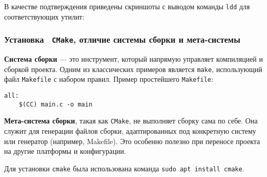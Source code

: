 В качестве подтверждения приведены скриншоты с выводом команды \texttt{ldd} для соответствующих утилит:






\subsubsection*{Установка  \texttt{CMake}, отличие системы сборки и мета-системы}

\textbf{Система сборки} — это инструмент, который напрямую управляет компиляцией и сборкой проекта. Одним из классических примеров является \texttt{make}, использующий файл \texttt{Makefile} с набором правил. Пример простейшего \texttt{Makefile}:

\begin{verbatim}
all:
	$(CC) main.c -o main
\end{verbatim}

\textbf{Мета-система сборки}, такая как \texttt{CMake}, не выполняет сборку сама по себе. Она служит для генерации файлов сборки, адаптированных под конкретную систему или генератор (например, Makefile). Это особенно полезно при переносе проекта на другие платформы и конфигурации.

Для установки \texttt{cmake} была использована команда \texttt{sudo apt install cmake}.


